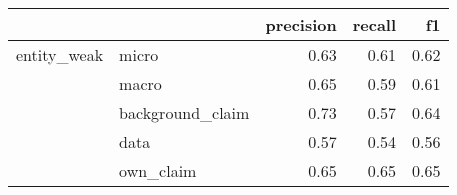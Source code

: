 \begin{tabular}{llrrr}
\toprule
            &           &  precision &  recall &   f1 \\
\midrule
entity\_weak & micro &       0.63 &    0.61 & 0.62 \\
            & macro &       0.65 &    0.59 & 0.61 \\
            & background\_claim &       0.73 &    0.57 & 0.64 \\
            & data &       0.57 &    0.54 & 0.56 \\
            & own\_claim &       0.65 &    0.65 & 0.65 \\
\bottomrule
\end{tabular}
